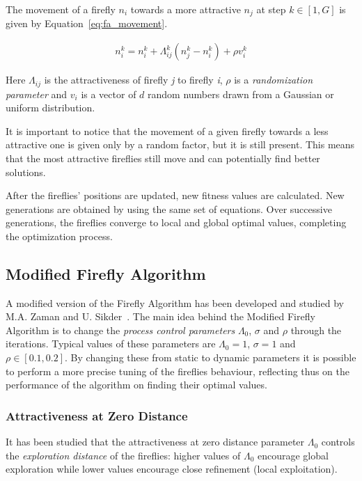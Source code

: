 The movement of a firefly $n_i$ towards a more attractive $n_j$ 
at step $k \in \left[1,G\right]$ is given by Equation~\ref{eq:fa_movement}.

\begin{align}
\label{eq:fa_movement}
n_i^k = n_i^k + \Lambda_{ij}^k\left(n_j^k-n_i^k\right)+\rho \mathit{v}_i^k
\end{align}

Here $\Lambda_{ij}$ is the attractiveness of firefly \textit{j} to firefly \textit{i},
$\rho$ is a \textit{randomization parameter} and $\mathit{v}_i$ is
a vector of $d$ random numbers drawn from a Gaussian or uniform distribution.

It is important to notice that the movement of a given firefly
towards a less attractive one is given only by a random factor, but it is still present.
This means that the most attractive fireflies still move and can
potentially find better solutions.

After the fireflies' positions are updated, new fitness values
are calculated. New generations are obtained
by using the same set of equations. Over successive generations,
the fireflies converge to local and global optimal values,
completing the optimization process.


\subsection{Modified Firefly Algorithm}
\label{sec:5.mfa}

A modified version of the Firefly Algorithm has been developed and studied
by M.A. Zaman and U. Sikder~\cite{zaman2015bouc}. The main idea behind
the Modified Firefly Algorithm is to change the \textit{process control parameters}
$\Lambda_0$, $\sigma$ and $\rho$ through the iterations. Typical values
of these parameters are $\Lambda_0=1$, $\sigma = 1$ and $\rho \in \left[0.1,0.2\right]$.
By changing these from static to dynamic parameters it is possible to perform
a more precise tuning of the fireflies behaviour, reflecting thus on the performance
of the algorithm on finding their optimal values.

\subsubsection{Attractiveness at Zero Distance}

It has been studied that the attractiveness at zero distance parameter $\Lambda_0$
controls the \textit{exploration distance} of the fireflies: 
higher values of $\Lambda_0$ encourage global exploration while
lower values encourage close refinement (local exploitation). 

